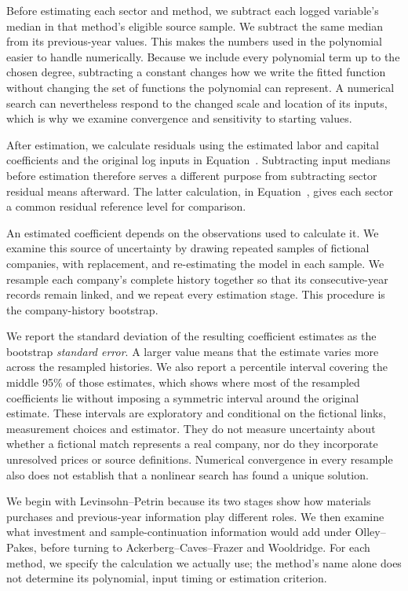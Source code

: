 Before estimating each sector and method, we subtract each logged variable's median in that method's eligible source sample. We subtract the same median from its previous-year values. This makes the numbers used in the polynomial easier to handle numerically. Because we include every polynomial term up to the chosen degree, subtracting a constant changes how we write the fitted function without changing the set of functions the polynomial can represent. A numerical search can nevertheless respond to the changed scale and location of its inputs, which is why we examine convergence and sensitivity to starting values.

After estimation, we calculate residuals using the estimated labor and capital coefficients and the original log inputs in Equation~. Subtracting input medians before estimation therefore serves a different purpose from subtracting sector residual means afterward. The latter calculation, in Equation~, gives each sector a common residual reference level for comparison.

An estimated coefficient depends on the observations used to calculate it. We examine this source of uncertainty by drawing repeated samples of fictional companies, with replacement, and re-estimating the model in each sample. We resample each company's complete history together so that its consecutive-year records remain linked, and we repeat every estimation stage. This procedure is the company-history bootstrap.

We report the standard deviation of the resulting coefficient estimates as the bootstrap \emph{standard error}. A larger value means that the estimate varies more across the resampled histories. We also report a percentile interval covering the middle 95\% of those estimates, which shows where most of the resampled coefficients lie without imposing a symmetric interval around the original estimate. These intervals are exploratory and conditional on the fictional links, measurement choices and estimator. They do not measure uncertainty about whether a fictional match represents a real company, nor do they incorporate unresolved prices or source definitions. Numerical convergence in every resample also does not establish that a nonlinear search has found a unique solution.

We begin with Levinsohn--Petrin because its two stages show how materials purchases and previous-year information play different roles. We then examine what investment and sample-continuation information would add under Olley--Pakes, before turning to Ackerberg--Caves--Frazer and Wooldridge. For each method, we specify the calculation we actually use; the method's name alone does not determine its polynomial, input timing or estimation criterion.

